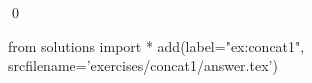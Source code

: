 
\begin{ex} 
  \label{ex:concat1}
  
  \qed
\end{ex} 
\begin{python0}
from solutions import *
add(label="ex:concat1",
    srcfilename='exercises/concat1/answer.tex') 
\end{python0}
